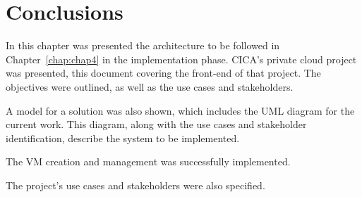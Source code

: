 
\section{Conclusions}

In this chapter was presented the architecture to be followed in Chapter~\ref{chap:chap4} in the implementation phase. CICA's private cloud project was presented, this document covering the front-end of that project. The objectives were outlined, as well as the use cases and stakeholders.

A model for a solution was also shown, which includes the UML diagram for the current work. This diagram, along with the use cases and stakeholder identification, describe the system to be implemented.

The VM creation and management was successfully implemented.

The project's use cases and stakeholders were also specified.
